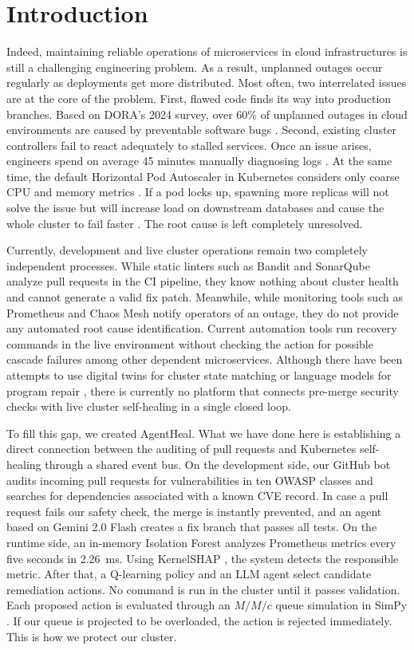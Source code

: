 \documentclass[10pt,conference]{IEEEtran}
\begin{document}
\section{Introduction}

Indeed, maintaining reliable operations of microservices in cloud infrastructures is still a challenging engineering problem. As a result, unplanned outages occur regularly as deployments get more distributed. Most often, two interrelated issues are at the core of the problem. First, flawed code finds its way into production branches. Based on DORA's 2024 survey, over 60\% of unplanned outages in cloud environments are caused by preventable software bugs \cite{dora2024}. Second, existing cluster controllers fail to react adequately to stalled services. Once an issue arises, engineers spend on average 45 minutes manually diagnosing logs \cite{dora2024}. At the same time, the default Horizontal Pod Autoscaler in Kubernetes considers only coarse CPU and memory metrics \cite{hpa}. If a pod locks up, spawning more replicas will not solve the issue but will increase load on downstream databases and cause the whole cluster to fail faster \cite{keptn}. The root cause is left completely unresolved.

Currently, development and live cluster operations remain two completely independent processes. While static linters such as Bandit \cite{bandit} and SonarQube \cite{sonarqube} analyze pull requests in the CI pipeline, they know nothing about cluster health and cannot generate a valid fix patch. Meanwhile, while monitoring tools such as Prometheus and Chaos Mesh \cite{chaoseng,sre} notify operators of an outage, they do not provide any automated root cause identification. Current automation tools run recovery commands in the live environment without checking the action for possible cascade failures among other dependent microservices. Although there have been attempts to use digital twins for cluster state matching \cite{sfdtm} or language models for program repair \cite{autocoderover}, there is currently no platform that connects pre-merge security checks with live cluster self-healing in a single closed loop.

To fill this gap, we created AgentHeal. What we have done here is establishing a direct connection between the auditing of pull requests and Kubernetes self-healing through a shared event bus. On the development side, our GitHub bot audits incoming pull requests for vulnerabilities in ten OWASP classes and searches for dependencies associated with a known CVE record. In case a pull request fails our safety check, the merge is instantly prevented, and an agent based on Gemini 2.0 Flash \cite{gemini2} creates a fix branch that passes all tests. On the runtime side, an in-memory Isolation Forest \cite{isolationforest} analyzes Prometheus metrics every five seconds in 2.26~ms. Using KernelSHAP \cite{kernelshap}, the system detects the responsible metric. After that, a Q-learning policy and an LLM agent select candidate remediation actions. No command is run in the cluster until it passes validation. Each proposed action is evaluated through an $M/M/c$ queue simulation in SimPy \cite{queueing}. If our queue is projected to be overloaded, the action is rejected immediately. This is how we protect our cluster.
\end{document}
